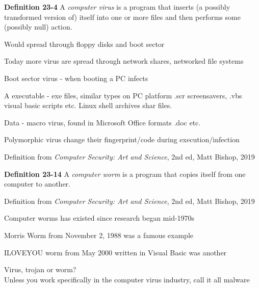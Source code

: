 \documentclass[Screen16to9,17pt]{foils}
\begin{document}

\begin{list1}
\item {\bf Definition 23-4} A \emph{computer virus} is a program that inserts (a possibly transformed version of) itself into one or more files and then performs some (possibly null) action.
\item Would spread through floppy disks and boot sector
\item Today more virus are spread through network shares, networked file systems
\begin{list2}
\item Boot sector virus - when booting a PC infects
\item A executable - exe files, similar types on PC platform .scr screensavers, .vbs visual basic scripts etc. Linux shell archives shar files.
\item Data - macro virus, found in Microsoft Office formats .doc etc.
\end{list2}
\item Polymorphic virus change their fingerprint/code during execution/infection
\item Definition from \emph{Computer Security: Art and Science}, 2nd ed, Matt Bishop, 2019
\end{list1}



\begin{list1}
\item {\bf Definition 23-14} A \emph{computer worm} is a program that copies itself from one computer to another.
\item Definition from \emph{Computer Security: Art and Science}, 2nd ed, Matt Bishop, 2019
\item Computer worms has existed since research began mid-1970s
\item Morris Worm from November 2, 1988 was a famous example
\item ILOVEYOU worm from May 2000 written in Visual Basic was another
\vskip 2cm
\item Virus, trojan or worm?\\
Unless you work specifically in the computer virus industry, call it all malware

\end{list1}



\end{document}
